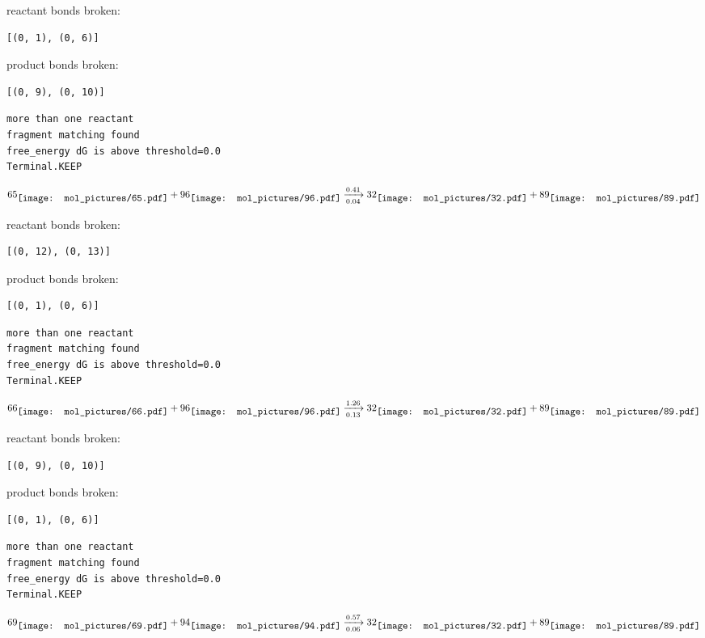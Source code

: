 \documentclass{article}
\begin{document}
reactant bonds broken:\begin{verbatim}
[(0, 1), (0, 6)]
\end{verbatim}
product bonds broken:\begin{verbatim}
[(0, 9), (0, 10)]
\end{verbatim}




\vspace{1cm}
\begin{verbatim}
more than one reactant
fragment matching found
free_energy dG is above threshold=0.0
Terminal.KEEP
\end{verbatim}
$$
65
\raisebox{-.5\height}{\texttt{[image: mol\_pictures/65.pdf]}}
+
96
\raisebox{-.5\height}{\texttt{[image: mol\_pictures/96.pdf]}}
\xrightarrow[0.04]{0.41}
32
\raisebox{-.5\height}{\texttt{[image: mol\_pictures/32.pdf]}}
+
89
\raisebox{-.5\height}{\texttt{[image: mol\_pictures/89.pdf]}}
$$


reactant bonds broken:\begin{verbatim}
[(0, 12), (0, 13)]
\end{verbatim}
product bonds broken:\begin{verbatim}
[(0, 1), (0, 6)]
\end{verbatim}




\vspace{1cm}
\begin{verbatim}
more than one reactant
fragment matching found
free_energy dG is above threshold=0.0
Terminal.KEEP
\end{verbatim}
$$
66
\raisebox{-.5\height}{\texttt{[image: mol\_pictures/66.pdf]}}
+
96
\raisebox{-.5\height}{\texttt{[image: mol\_pictures/96.pdf]}}
\xrightarrow[0.13]{1.26}
32
\raisebox{-.5\height}{\texttt{[image: mol\_pictures/32.pdf]}}
+
89
\raisebox{-.5\height}{\texttt{[image: mol\_pictures/89.pdf]}}
$$


reactant bonds broken:\begin{verbatim}
[(0, 9), (0, 10)]
\end{verbatim}
product bonds broken:\begin{verbatim}
[(0, 1), (0, 6)]
\end{verbatim}




\vspace{1cm}
\begin{verbatim}
more than one reactant
fragment matching found
free_energy dG is above threshold=0.0
Terminal.KEEP
\end{verbatim}
$$
69
\raisebox{-.5\height}{\texttt{[image: mol\_pictures/69.pdf]}}
+
94
\raisebox{-.5\height}{\texttt{[image: mol\_pictures/94.pdf]}}
\xrightarrow[0.06]{0.57}
32
\raisebox{-.5\height}{\texttt{[image: mol\_pictures/32.pdf]}}
+
89
\raisebox{-.5\height}{\texttt{[image: mol\_pictures/89.pdf]}}
$$
\end{document}
